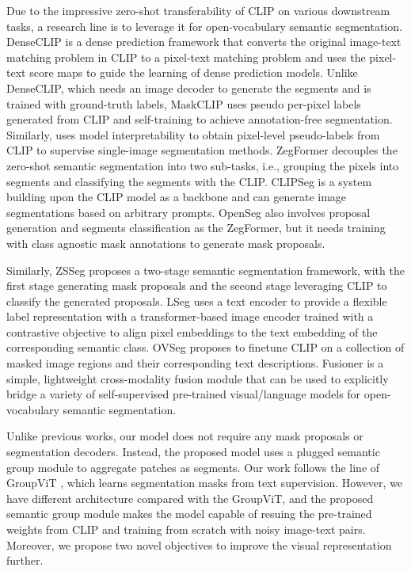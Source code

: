 \documentclass{article}
\theoremstyle{plain}
\theoremstyle{definition}
\theoremstyle{remark}
\begin{document}
Due to the impressive zero-shot transferability of CLIP \cite{Radford2021Learning} on various downstream tasks, a research line is to leverage it for open-vocabulary semantic segmentation. DenseCLIP \cite{Rao2022DenseCLIP} is a dense prediction framework that converts the original image-text matching problem in CLIP to a pixel-text matching problem and uses the pixel-text score maps to guide the learning of dense prediction models. Unlike DenseCLIP, which needs an image decoder to generate the segments and is trained with ground-truth labels, MaskCLIP \cite{zhou2022maskclip} uses pseudo per-pixel labels generated from CLIP and self-training to achieve annotation-free segmentation. Similarly, \cite{Zabari2021Semantic} uses model interpretability to obtain pixel-level pseudo-labels from CLIP to supervise single-image segmentation methods. ZegFormer \cite{Ding2022Decoupling} decouples the zero-shot semantic segmentation into two sub-tasks, i.e., grouping the pixels into segments and classifying the segments with the CLIP. CLIPSeg \cite{Lueddecke2022Image} is a system building upon the CLIP model as a backbone and can generate image segmentations based on arbitrary prompts. OpenSeg \cite{Ghiasi2021Scaling} also involves proposal generation and segments classification as the ZegFormer, but it needs training with class agnostic mask annotations to generate mask proposals. 

Similarly, ZSSeg \cite{Xu2021A} proposes a two-stage semantic segmentation framework, with the first stage generating mask proposals and the second stage leveraging CLIP to classify the generated proposals. LSeg \cite{li2022languagedriven} uses a text encoder to provide a flexible label representation with a transformer-based image encoder trained with a contrastive objective to align pixel embeddings to the text embedding of the corresponding semantic class. OVSeg \cite{Liang2022Open} proposes to finetune CLIP on a collection of masked image regions and their corresponding text descriptions. Fusioner \cite{Ma2022Open} is a simple, lightweight cross-modality fusion module that can be used to explicitly bridge a variety of self-supervised pre-trained visual/language models for open-vocabulary semantic segmentation.

Unlike previous works, our model does not require any mask proposals or segmentation decoders. Instead, the proposed model uses a plugged semantic group module to aggregate patches as segments. Our work follows the line of GroupViT \cite{Xu2022GroupViT}, which learns segmentation masks from text supervision. However, we have different architecture compared with the GroupViT, and the proposed semantic group module makes the model capable of resuing the pre-trained weights from CLIP and training from scratch with noisy image-text pairs. Moreover, we propose two novel objectives to improve the visual representation further.
\end{document}
